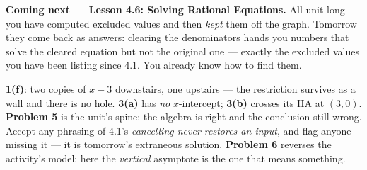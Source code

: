 \documentclass[10pt]{article}
\begin{document}
\begin{spiralbox}
\textbf{Coming next --- Lesson 4.6: Solving Rational Equations.} All unit long you have computed
excluded values and then \emph{kept} them off the graph. Tomorrow they come back as answers: clearing
the denominators hands you numbers that solve the cleared equation but not the original one --- exactly
the excluded values you have been listing since 4.1. You already know how to find them.
\end{spiralbox}

\begin{teachernote}
\textbf{1(f)}: two copies of $x-3$ downstairs, one upstairs --- the restriction survives as a wall and
there is no hole. \textbf{3(a)} has \emph{no} $x$-intercept; \textbf{3(b)} crosses its HA at $(3,0)$.
\textbf{Problem 5} is the unit's spine: the algebra is right and the conclusion still wrong. Accept any
phrasing of 4.1's \emph{cancelling never restores an input}, and flag anyone missing it --- it is
tomorrow's extraneous solution. \textbf{Problem 6} reverses the activity's model: here the
\emph{vertical} asymptote is the one that means something.
\end{teachernote}
\end{document}
